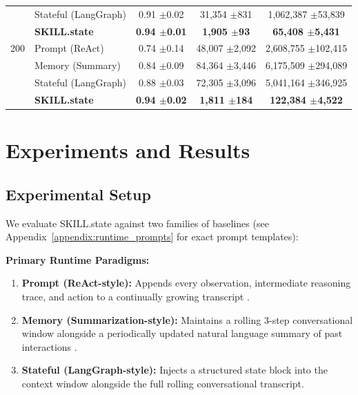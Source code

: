 \documentclass[11pt]{article}
\begin{document}
\begin{table}[t]
{\begin{tabular}{llccc}
& Stateful (LangGraph) & 0.91 \tiny{$\pm$0.02} & 31,354 \tiny{$\pm$831} & 1,062,387 \tiny{$\pm$53,839} \\
& \textbf{SKILL.state} & \textbf{0.94 \tiny{$\pm$0.01}} & \textbf{1,905 \tiny{$\pm$93}} & \textbf{65,408 \tiny{$\pm$5,431}} \\
\midrule
200 & Prompt (ReAct) & 0.74 \tiny{$\pm$0.14} & 48,007 \tiny{$\pm$2,092} & 2,608,755 \tiny{$\pm$102,415} \\
& Memory (Summary) & 0.84 \tiny{$\pm$0.09} & 84,364 \tiny{$\pm$3,446} & 6,175,509 \tiny{$\pm$294,089} \\
& Stateful (LangGraph) & 0.88 \tiny{$\pm$0.03} & 72,305 \tiny{$\pm$3,096} & 5,041,164 \tiny{$\pm$346,925} \\
& \textbf{SKILL.state} & \textbf{0.94 \tiny{$\pm$0.02}} & \textbf{1,811 \tiny{$\pm$184}} & \textbf{122,384 \tiny{$\pm$4,522}} \\
\bottomrule
\end{tabular}%
}
\end{table}

\section{Experiments and Results}
\label{sec:experiments}

\subsection{Experimental Setup}
\label{subsec:setup}

We evaluate SKILL.state against two families of baselines (see Appendix~\ref{appendix:runtime_prompts} for exact prompt templates):

\noindent\textbf{Primary Runtime Paradigms:}
\begin{enumerate}[leftmargin=*]
    \item \textbf{Prompt (ReAct-style):} Appends every observation, intermediate reasoning trace, and action to a continually growing transcript \citep{yao2022react}.
    \item \textbf{Memory (Summarization-style):} Maintains a rolling 3-step conversational window alongside a periodically updated natural language summary of past interactions \citep{packer2023memgpt}.
    \item \textbf{Stateful (LangGraph-style):} Injects a structured state block into the context window alongside the full rolling conversational transcript.
\end{enumerate}
\end{document}
